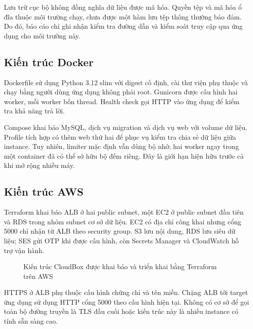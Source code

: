 Lưu trữ cục bộ không đồng nghĩa dữ liệu được mã hóa. Quyền tệp và mã hóa ổ đĩa thuộc môi trường chạy, chưa được một hàm lưu tệp thông thường bảo đảm. Do đó, báo cáo chỉ ghi nhận kiểm tra đường dẫn và kiểm soát truy cập qua ứng dụng cho môi trường này.
\subsection{Kiến trúc Docker}
Dockerfile sử dụng Python 3.12 slim với digest cố định, cài thư viện phụ thuộc và chạy bằng người dùng ứng dụng không phải root. Gunicorn được cấu hình hai worker, mỗi worker bốn thread. Health check gọi HTTP vào ứng dụng để kiểm tra khả năng trả lời.

Compose khai báo MySQL, dịch vụ migration và dịch vụ web với volume dữ liệu. Profile tích hợp có thêm web thứ hai để phục vụ kiểm tra chia sẻ dữ liệu giữa instance. Tuy nhiên, limiter mặc định vẫn dùng bộ nhớ; hai worker ngay trong một container đã có thể sở hữu bộ đếm riêng. Đây là giới hạn hiện hữu trước cả khi mở rộng nhiều máy.
\subsection{Kiến trúc AWS}
Terraform khai báo ALB ở hai public subnet, một EC2 ở public subnet đầu tiên và RDS trong nhóm subnet cơ sở dữ liệu. EC2 có địa chỉ công khai nhưng cổng 5000 chỉ nhận từ ALB theo security group. S3 lưu nội dung, RDS lưu siêu dữ liệu; SES gửi OTP khi được cấu hình, còn Secrets Manager và CloudWatch hỗ trợ vận hành.
\begin{figure}[htbp]\centering
{}
\caption{Kiến trúc CloudBox được khai báo và triển khai bằng Terraform trên AWS}
\end{figure}
HTTPS ở ALB phụ thuộc cấu hình chứng chỉ và tên miền. Chặng ALB tới target ứng dụng sử dụng HTTP cổng 5000 theo cấu hình hiện tại. Không có cơ sở để gọi toàn bộ đường truyền là TLS đầu cuối hoặc kiến trúc này là nhiều instance có tính sẵn sàng cao.


